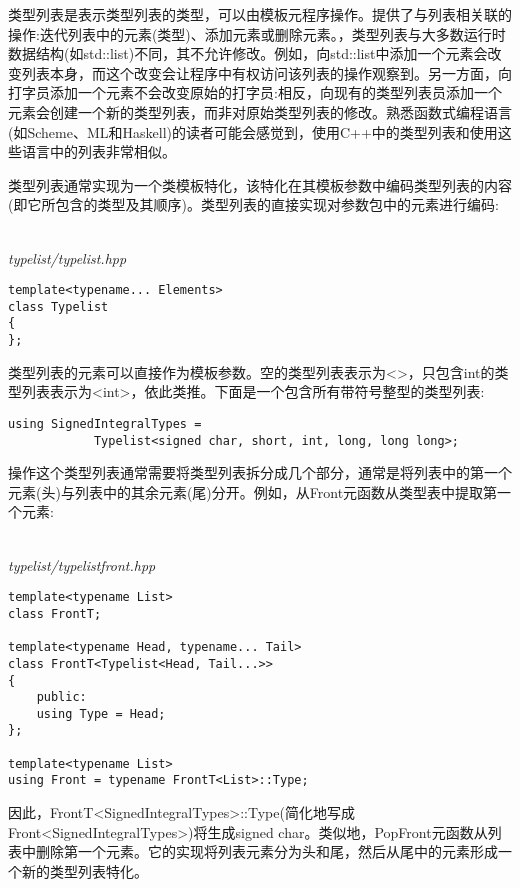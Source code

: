 类型列表是表示类型列表的类型，可以由模板元程序操作。提供了与列表相关联的操作:迭代列表中的元素(类型)、添加元素或删除元素。，类型列表与大多数运行时数据结构(如std::list)不同，其不允许修改。例如，向std::list中添加一个元素会改变列表本身，而这个改变会让程序中有权访问该列表的操作观察到。另一方面，向打字员添加一个元素不会改变原始的打字员:相反，向现有的类型列表员添加一个元素会创建一个新的类型列表，而非对原始类型列表的修改。熟悉函数式编程语言(如Scheme、ML和Haskell)的读者可能会感觉到，使用C++中的类型列表和使用这些语言中的列表非常相似。

类型列表通常实现为一个类模板特化，该特化在其模板参数中编码类型列表的内容(即它所包含的类型及其顺序)。类型列表的直接实现对参数包中的元素进行编码:

\hspace*{\fill} \\ %
\noindent
\textit{typelist/typelist.hpp}
\begin{lstlisting}[style=styleCXX]
template<typename... Elements>
class Typelist
{
};
\end{lstlisting}

类型列表的元素可以直接作为模板参数。空的类型列表表示为<>，只包含int的类型列表表示为<int>，依此类推。下面是一个包含所有带符号整型的类型列表:

\begin{lstlisting}[style=styleCXX]
using SignedIntegralTypes =
			Typelist<signed char, short, int, long, long long>;
\end{lstlisting}

操作这个类型列表通常需要将类型列表拆分成几个部分，通常是将列表中的第一个元素(头)与列表中的其余元素(尾)分开。例如，从Front元函数从类型表中提取第一个元素:

\hspace*{\fill} \\ %
\noindent
\textit{typelist/typelistfront.hpp}
\begin{lstlisting}[style=styleCXX]
template<typename List>
class FrontT;

template<typename Head, typename... Tail>
class FrontT<Typelist<Head, Tail...>>
{
	public:
	using Type = Head;
};

template<typename List>
using Front = typename FrontT<List>::Type;
\end{lstlisting}

因此，FrontT<SignedIntegralTypes>::Type(简化地写成Front<SignedIntegralTypes>)将生成signed char。类似地，PopFront元函数从列表中删除第一个元素。它的实现将列表元素分为头和尾，然后从尾中的元素形成一个新的类型列表特化。

